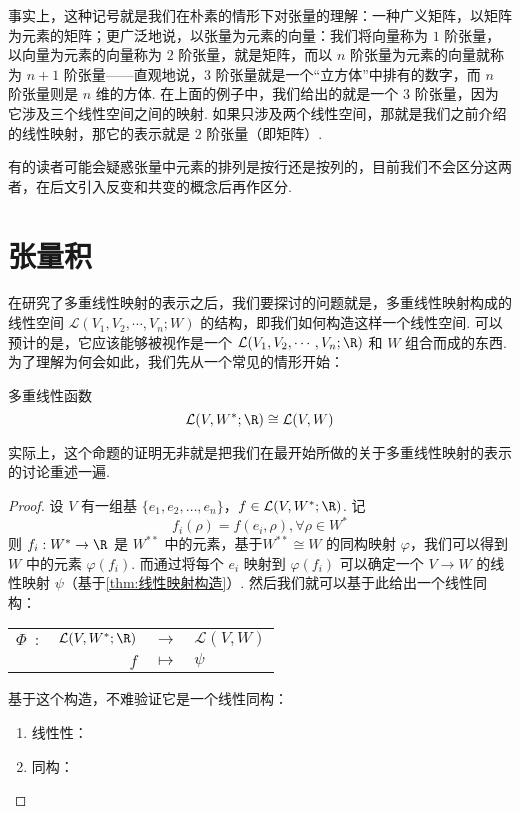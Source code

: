 事实上，这种记号就是我们在朴素的情形下对张量的理解：一种广义矩阵，以矩阵为元素的矩阵；更广泛地说，以张量为元素的向量：我们将向量称为 $1$ 阶张量，以向量为元素的向量称为 $2$ 阶张量，就是矩阵，而以 $n$ 阶张量为元素的向量就称为 $n + 1$ 阶张量——直观地说，$3$ 阶张量就是一个“立方体”中排有的数字，而 $n$ 阶张量则是 $n$ 维的方体. 在上面的例子中，我们给出的就是一个 $3$ 阶张量，因为它涉及三个线性空间之间的映射. 如果只涉及两个线性空间，那就是我们之前介绍的线性映射，那它的表示就是 $2$ 阶张量（即矩阵）.

有的读者可能会疑惑张量中元素的排列是按行还是按列的，目前我们不会区分这两者，在后文引入反变和共变的概念后再作区分.

\section{张量积}

在研究了多重线性映射的表示之后，我们要探讨的问题就是，多重线性映射构成的线性空间 $\mathcal{L}(V_1, V_2, \cdots, V_n; W)$ 的结构，即我们如何构造这样一个线性空间. 可以预计的是，它应该能够被视作是一个 $\mathcal{L}(V_1, V_2, \cdots, V_n; \R)$ 和 $W$ 组合而成的东西. 为了理解为何会如此，我们先从一个常见的情形开始：

\begin{lemma}{}{多重线性函数}
    \[
    \mathcal{L}(V, W^*; \R) \cong \mathcal{L}(V, W)
    \]
\end{lemma}

实际上，这个命题的证明无非就是把我们在最开始所做的关于多重线性映射的表示的讨论重述一遍.

\begin{proof}
    设 $V$ 有一组基 $\{e_1, e_2, \ldots, e_n\}$，$f \in \mathcal{L}(V, W^*; \R)$. 记
    \[
    f_i (\rho) = f(e_i, \rho), \forall \rho \in W^*
    \]
    则 $f_i: W^* \to \R$ 是 $W^{**}$ 中的元素，基于$W^{**} \cong W$ 的同构映射 $\varphi$，我们可以得到 $W$ 中的元素 $\varphi(f_i)$. 而通过将每个 $e_i$ 映射到 $\varphi(f_i)$ 可以确定一个 $V \to W$ 的线性映射 $\psi$（基于\autoref{thm:线性映射构造}）. 然后我们就可以基于此给出一个线性同构：
    \begin{center}
        \begin{tabular}{rrcl}
            $\Phi\enspace\colon$      & $\mathcal{L}(V, W^*; \R)$ & $\to$     & $\mathcal{L}(V, W)$ \\
                                   & $f$                      & $\mapsto$ & $\psi$
        \end{tabular}
    \end{center}

    基于这个构造，不难验证它是一个线性同构：
    \begin{enumerate}
        \item 线性性：
        \item 同构：
    \end{enumerate}
\end{proof}

